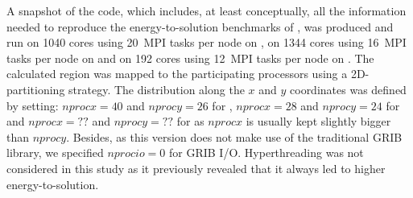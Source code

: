 A snapshot of the code, which includes, at least conceptually, all the
information needed  to reproduce the  energy-to-solution benchmarks of
\cosmoart, was produced  and run on 1040 cores  using 20~MPI tasks per
node on  \monch, on 1344 cores  using 16~MPI tasks per  node on \pilat
and  on  192  cores  using  12~MPI  tasks per  node  on  \tinto.   The
calculated region  was mapped to the participating  processors using a
2D-partitioning  strategy.  The  distribution  along the  $x$ and  $y$
coordinates was  defined by  setting: $nprocx=40$ and  $nprocy=26$ for
\monch,  $nprocx=28$ and  $nprocy=24$ for  \pilat and  $nprocx=??$ and
$nprocy=??$  for \tinto as  $nprocx$ is  usually kept  slightly bigger
than  $nprocy$. Besides,  as this  version does  not make  use  of the
traditional  GRIB  library, we  specified  $nprocio=0$  for GRIB  I/O.
Hyperthreading  was not  considered  in this  study  as it  previously
revealed that it always led to higher energy-to-solution.
